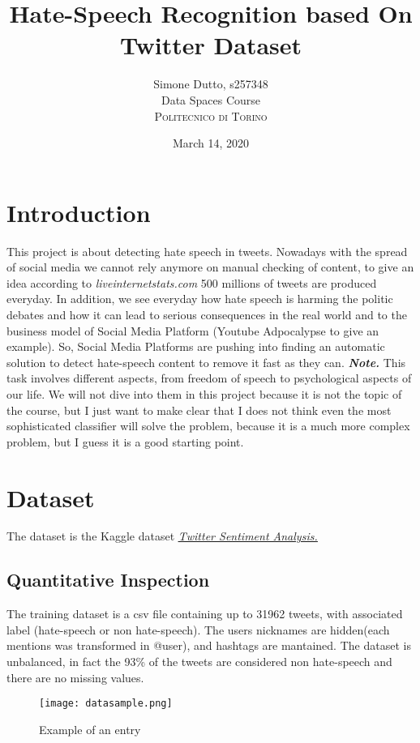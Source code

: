 \documentclass[12pt]{article}
\title{Hate-Speech Recognition based On Twitter Dataset} %
\author{Simone Dutto, s257348\\ %
Data Spaces Course\\ %
\textsc{Politecnico di Torino}
}
\date{March 14, 2020} %
\begin{document}
\setlength{\droptitle}{+15em}    
\maketitle
\newpage
\tableofcontents
\newpage
\section{Introduction}
This project is about detecting hate speech in tweets. Nowadays with the spread of social media we cannot rely anymore on manual checking of content, to give an idea  according to \textit{liveinternetstats.com} 500 millions of tweets are produced everyday. 
In addition, we see everyday how hate speech is harming the politic debates and how it can lead to serious consequences in the real world and to the business model of Social Media Platform (Youtube Adpocalypse to give an example). \newline
So, Social Media Platforms are pushing into finding an automatic solution to detect hate-speech content to remove it fast as they can. 
\newline
\textbf{\textit{Note. }}
This task involves different aspects, from freedom of speech to psychological aspects of our life. We will not dive into them in this project because it is not the topic of the course, but I just want to make clear that I does not think even the most sophisticated classifier will solve the problem, because it is a much more complex problem, but I guess it is a good starting point.
\section{Dataset}
The dataset is the Kaggle dataset \href{https://www.kaggle.com/arkhoshghalb/twitter-sentiment-analysis-hatred-speech}{\underline{\textit{Twitter Sentiment Analysis.}}}
\subsection{Quantitative Inspection}
The training dataset is a csv file containing up to 31962 tweets, with associated label (hate-speech or non hate-speech). 
The users nicknames are hidden(each mentions was transformed in @user), and hashtags are mantained. 
The dataset is unbalanced, in fact the 93\% of the tweets are considered non hate-speech and there are no missing values. 
\newline
\begin{figure}[h]
\centering
\texttt{[image: datasample.png]}
\caption{Example of an entry}
\end{figure}
\end{document}
